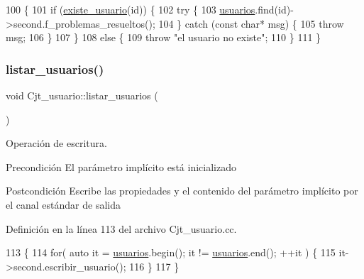 \begin{DoxyCode}
100                                                \{
101   \textcolor{keywordflow}{if} (\mbox{\hyperlink{class_cjt__usuario_a2d4478e6b967659040f5a0b86b665204}{existe\_usuario}}(\textcolor{keywordtype}{id})) \{
102     \textcolor{keywordflow}{try} \{
103     \mbox{\hyperlink{class_cjt__usuario_af814d06f1c52bc2e744d253d20ce6e6b}{usuarios}}.find(\textcolor{keywordtype}{id})->second.f\_problemas\_resueltos();
104   \} \textcolor{keywordflow}{catch} (\textcolor{keyword}{const} \textcolor{keywordtype}{char}* msg) \{
105       \textcolor{keywordflow}{throw} msg;
106   \}
107   \}
108   \textcolor{keywordflow}{else} \{
109     \textcolor{keywordflow}{throw} \textcolor{stringliteral}{"el usuario no existe"};
110   \}
111 \}
\end{DoxyCode}
\mbox{\label{class_cjt__usuario_a4cd3e0812c3b3d7e9e83c0f8d0c2acb3}} 
\subsubsection{\texorpdfstring{listar\+\_\+usuarios()}{listar\_usuarios()}}
{\footnotesize\ttfamily void Cjt\+\_\+usuario\+::listar\+\_\+usuarios (\begin{DoxyParamCaption}{ }\end{DoxyParamCaption})}



Operación de escritura. 

\begin{DoxyPrecond}{Precondición}
El parámetro implícito está inicializado 
\end{DoxyPrecond}
\begin{DoxyPostcond}{Postcondición}
Escribe las propiedades y el contenido del parámetro implícito por el canal estándar de salida 
\end{DoxyPostcond}


Definición en la línea 113 del archivo Cjt\+\_\+usuario.\+cc.


\begin{DoxyCode}
113                                   \{
114   \textcolor{keywordflow}{for}( \textcolor{keyword}{auto} it = \mbox{\hyperlink{class_cjt__usuario_af814d06f1c52bc2e744d253d20ce6e6b}{usuarios}}.begin(); it != \mbox{\hyperlink{class_cjt__usuario_af814d06f1c52bc2e744d253d20ce6e6b}{usuarios}}.end(); ++it ) \{
115     it->second.escribir\_usuario();
116   \}
117 \}
\end{DoxyCode}
\mbox{\label{class_cjt__usuario_aa1b390ae2335eb486d2a0c8c32643d5c}} 
